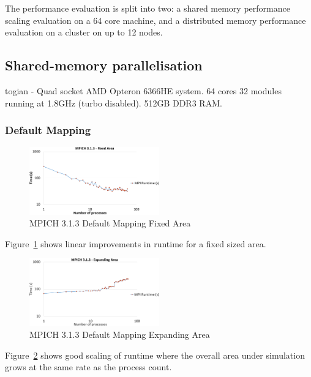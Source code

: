 The performance evaluation is split into two: a shared memory performance
scaling evaluation on a 64 core machine, and a distributed memory performance
evaluation on a cluster on up to 12 nodes.

\subsection{Shared-memory parallelisation}

togian - Quad socket AMD Opteron 6366HE system. 64 cores 32 modules running at
1.8GHz (turbo disabled). 512GB DDR3 RAM.

\subsubsection{Default Mapping}

\begin{figure}
    \includegraphics[page=1,width=0.5\textwidth]
    {graphs/MPICH313-default-mapping-fixed-area-crop.pdf}
    \caption{MPICH 3.1.3 Default Mapping Fixed Area}
    \label{fig:mpichdefaultmappingfixedarea}
\end{figure}

Figure~\ref{fig:mpichdefaultmappingfixedarea} shows linear improvements in
runtime for a fixed sized area.

\begin{figure}
    \includegraphics[page=1,width=0.5\textwidth]
    {graphs/MPICH313-default-mapping-expanding-area-crop.pdf}
    \caption{MPICH 3.1.3 Default Mapping Expanding Area}
    \label{fig:mpichdefaultmappingexpandingarea}
\end{figure}

Figure~\ref{fig:mpichdefaultmappingexpandingarea} shows good scaling of runtime
where the overall area under simulation grows at the same rate as the process
count.

